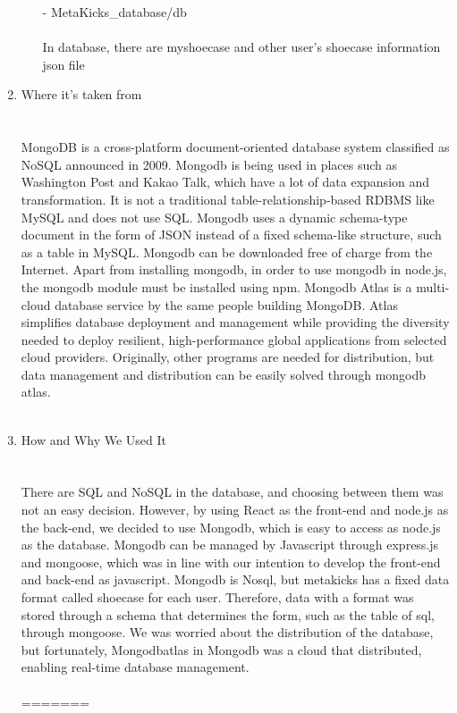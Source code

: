 \documentclass[conference]{IEEEtran}
\begin{document}
\begin{enumerate}
\begin{enumerate}
		\item[-]MetaKicks\_database/db \\\\
		In database, there are myshoecase and other user's shoecase information json file\\
	\end{enumerate}
\item Where it's taken from\\
\\\\MongoDB is a cross-platform document-oriented database system classified as NoSQL announced in 2009. Mongodb is being used in places such as Washington Post and Kakao Talk, which have a lot of data expansion and transformation. It is not a traditional table-relationship-based RDBMS like MySQL and does not use SQL. Mongodb uses a dynamic schema-type document in the form of JSON instead of a fixed schema-like structure, such as a table in MySQL. Mongodb can be downloaded free of charge from the Internet. Apart from installing mongodb, in order to use mongodb in node.js, the mongodb module must be installed using npm. Mongodb Atlas is a multi-cloud database service by the same people building MongoDB. Atlas simplifies database deployment and management while providing the diversity needed to deploy resilient, high-performance global applications from selected cloud providers. Originally, other programs are needed for distribution, but data management and distribution can be easily solved through mongodb atlas.\\\\
\item How and Why We Used It\\
\\\\There are SQL and NoSQL in the database, and choosing between them was not an easy decision. However, by using React as the front-end and node.js as the back-end, we decided to use Mongodb, which is easy to access as node.js as the database. Mongodb can be managed by Javascript through express.js and mongoose, which was in line with our intention to develop the front-end and back-end as javascript. Mongodb is Nosql, but metakicks has a fixed data format called shoecase for each user. Therefore, data with a format was stored through a schema that determines the form, such as the table of sql, through mongoose. We was worried about the distribution of the database, but fortunately, Mongodbatlas in Mongodb was a cloud that distributed, enabling real-time database management.\\\\
=======

\end{enumerate}
\end{document}
